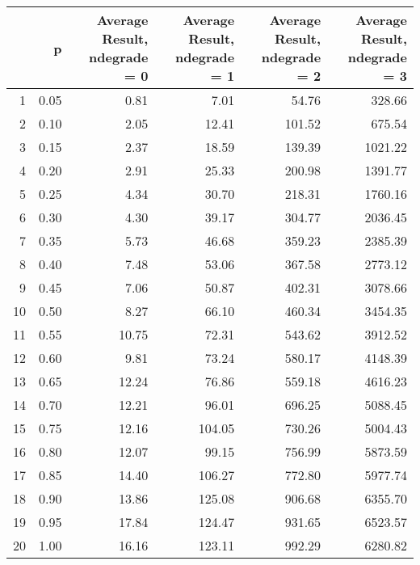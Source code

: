 \begin{table}[ht]
\centering
\begin{tabular}{rrrrrr}
  \hline
 & p & Average Result, ndegrade = 0 & Average Result, ndegrade = 1 & Average Result, ndegrade = 2 & Average Result, ndegrade = 3 \\ 
  \hline
1 & 0.05 & 0.81 & 7.01 & 54.76 & 328.66 \\ 
  2 & 0.10 & 2.05 & 12.41 & 101.52 & 675.54 \\ 
  3 & 0.15 & 2.37 & 18.59 & 139.39 & 1021.22 \\ 
  4 & 0.20 & 2.91 & 25.33 & 200.98 & 1391.77 \\ 
  5 & 0.25 & 4.34 & 30.70 & 218.31 & 1760.16 \\ 
  6 & 0.30 & 4.30 & 39.17 & 304.77 & 2036.45 \\ 
  7 & 0.35 & 5.73 & 46.68 & 359.23 & 2385.39 \\ 
  8 & 0.40 & 7.48 & 53.06 & 367.58 & 2773.12 \\ 
  9 & 0.45 & 7.06 & 50.87 & 402.31 & 3078.66 \\ 
  10 & 0.50 & 8.27 & 66.10 & 460.34 & 3454.35 \\ 
  11 & 0.55 & 10.75 & 72.31 & 543.62 & 3912.52 \\ 
  12 & 0.60 & 9.81 & 73.24 & 580.17 & 4148.39 \\ 
  13 & 0.65 & 12.24 & 76.86 & 559.18 & 4616.23 \\ 
  14 & 0.70 & 12.21 & 96.01 & 696.25 & 5088.45 \\ 
  15 & 0.75 & 12.16 & 104.05 & 730.26 & 5004.43 \\ 
  16 & 0.80 & 12.07 & 99.15 & 756.99 & 5873.59 \\ 
  17 & 0.85 & 14.40 & 106.27 & 772.80 & 5977.74 \\ 
  18 & 0.90 & 13.86 & 125.08 & 906.68 & 6355.70 \\ 
  19 & 0.95 & 17.84 & 124.47 & 931.65 & 6523.57 \\ 
  20 & 1.00 & 16.16 & 123.11 & 992.29 & 6280.82 \\ 
   \hline
\end{tabular}
\end{table}
